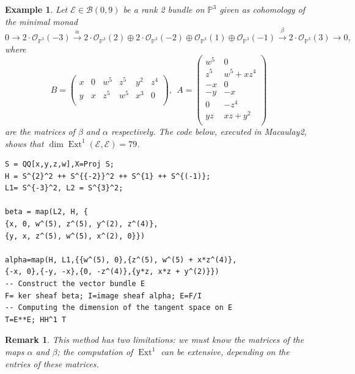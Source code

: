 \documentclass[twoside,reqno]{amsart}
\theoremstyle{plain}
\newtheorem{remark}[theorem]{Remark}
\newtheorem{example}[theorem]{Example}
\DeclareMathOperator{\Ext}{Ext}
\newcommand{\E}{\mathcal{E}}
\begin{document}
\begin{example}\label{ex1}
\textup{Let $\E\in\mathcal{B}(0,9)$ be a rank 2 bundle on $\mathbb{P}^3$ given as cohomology of the minimal monad
\begin{equation*}
0\rightarrow2\cdot\mathcal{O}_{\mathbb{P}^{3}}(-3)\stackrel{\alpha}{\rightarrow}2\cdot\mathcal{O}_{\mathbb{P}^{3}}(2)\oplus2\cdot\mathcal{O}_{\mathbb{P}^{3}}(-2)\oplus \mathcal{O}_{\mathbb{P}^{3}}(1)\oplus\mathcal{O}_{\mathbb{P}^{3}}(-1)\stackrel{\beta}{\rightarrow}2\cdot\mathcal{O}_{\mathbb{P}^{3}}(3)\rightarrow0,
\end{equation*}
where 
$$B=\left(
\begin{array}{cccccc}
x& 0&w^{5}& z^{5}& y^{2}& z^{4}\\
y& x& z^{5}& w^{5}& x^{3}& 0\\
\end{array} \right),
~~A=\left(
\begin{array}{cc}
w^{5}&0\\
z^{5}&w^{5}+xz^{4}\\
-x&0\\
-y&-x\\
0&-z^{4}\\
yz&xz+y^{2}\\
\end{array}
\right)$$
are the matrices of $\beta$ and $\alpha$ respectively. The code below, executed in Macaulay2, shows that $\dim\Ext^1(\E,\E)=79$.}
\begin{lstlisting}[language=Macaulay2]
S = QQ[x,y,z,w],X=Proj S;
H = S^{2}^2 ++ S^{{-2}}^2 ++ S^{1} ++ S^{(-1)};
L1= S^{-3}^2, L2 = S^{3}^2;

beta = map(L2, H, {
{x, 0, w^(5), z^(5), y^(2), z^(4)},
{y, x, z^(5), w^(5), x^(2), 0}})

alpha=map(H, L1,{{w^(5), 0},{z^(5), w^(5) + x*z^(4)},
{-x, 0},{-y, -x},{0, -z^(4)},{y*z, x*z + y^(2)}})
-- Construct the vector bundle E
F= ker sheaf beta; I=image sheaf alpha; E=F/I
-- Computing the dimension of the tangent space on E
T=E**E; HH^1 T
\end{lstlisting}

\end{example}

\begin{remark}
This method has two limitations: we must know the matrices of the maps $\alpha$ and $\beta$; the computation of $\Ext^1$ can 
be extensive, depending on the entries of these matrices.
\end{remark}
\end{document}
